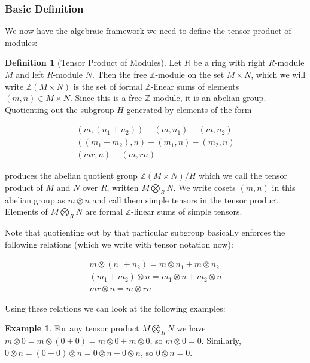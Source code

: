 \documentclass[11pt]{article}
\theoremstyle{definition}
\newtheorem*{defn}{Definition}
\theoremstyle{plain}
\theoremstyle{plain}
\theoremstyle{plain}
\theoremstyle{definition}
\newtheorem{ex}{Example}
\begin{document}
\subsubsection*{Basic Definition}

We now have the algebraic framework we need to define the tensor product of modules:

\begin{defn}[Tensor Product of Modules]
Let $R$ be a ring with right $R$-module $M$ and left $R$-module $N$. Then the free $\mathbb{Z}$-module on the set $M \times N$, which we will write $\mathbb{Z}(M \times N)$ is the set of formal $\mathbb{Z}$-linear sums of elements $(m,n) \in M \times N$. Since this is a free $\mathbb{Z}$-module, it is an abelian group. Quotienting out the subgroup $H$ generated by elements of the form

\begin{equation*}
\begin{array}{cc}
(m, (n_1 + n_2)) - (m, n_1) - (m, n_2) \\
((m_1 + m_2), n) - (m_1, n) - (m_2, n) \\
(mr, n) - (m, rn)
\end{array}
\end{equation*}

produces the abelian quotient group $\mathbb{Z}(M \times N) / H$ which we call the tensor product of $M$ and $N$ over $R$, written $M \bigotimes_{R} N$. We write cosets $(m,n)$ in this abelian group as $m \otimes n$ and call them simple tensors in the tensor product. Elements of $M \bigotimes_{R} N$ are formal $\mathbb{Z}$-linear sums of simple tensors.
\end{defn}

Note that quotienting out by that particular subgroup basically enforces the following relations (which we write with tensor notation now):

\begin{equation*}
\begin{array}{cc}
m \otimes (n_1 + n_2) = m \otimes n_1 + m \otimes n_2 \\
(m_1 + m_2) \otimes n = m_1 \otimes n + m_2 \otimes n \\
mr \otimes n = m \otimes rn
\end{array}
\end{equation*}

Using these relations we can look at the following examples:

\begin{ex}
For any tensor product $M \bigotimes_R N$ we have $m \otimes 0 = m \otimes (0 + 0) = m \otimes 0 + m \otimes 0$, so $m \otimes 0 = 0$. Similarly, $0 \otimes n = (0 + 0) \otimes n = 0 \otimes n + 0 \otimes n$, so $0 \otimes n = 0$.
\end{ex}
\end{document}
